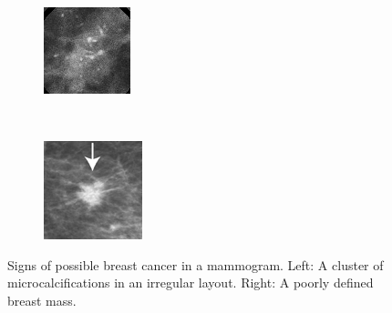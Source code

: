 \begin{figure}[h]
	\centering
	\begin{subfigure}{0.3\textwidth}
                \includegraphics[width=\textwidth]{plots/breastMicrocalcification.png}
        \end{subfigure}
	~
	\begin{subfigure}{0.3\textwidth}
                \includegraphics[width=\textwidth]{plots/breastMass.png}
        \end{subfigure}
	\caption[Breast Cancer Signs]{Signs of possible breast cancer in a mammogram. Left: A cluster of microcalcifications in an irregular layout. Right: A poorly defined breast mass.}
	\label{fig:breastCancerSigns}
\end{figure}

